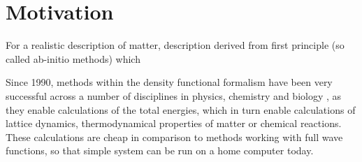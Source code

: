 \documentclass[main.tex]{subfiles}
\begin{document}
\chapter{Motivation}

For a realistic description of matter, description derived from first principle (so called ab-initio methods) which 

Since 1990, methods within the density functional formalism have been very successful across a number of disciplines in physics, chemistry and biology \cite{jones_density_2015}, as they enable calculations of the total energies, which in turn enable calculations of lattice dynamics, thermodynamical properties of matter or chemical reactions.
These calculations are cheap in comparison to methods working with full wave functions, so that simple system can be run on a home computer today.
\end{document}
